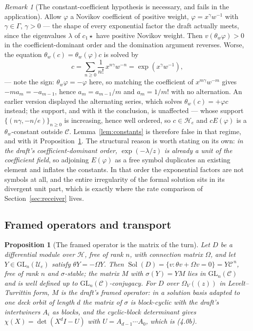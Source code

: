 \documentclass[11pt]{article}
\newtheorem{proposition}[theorem]{Proposition}
\theoremstyle{definition}
\theoremstyle{remark}
\newtheorem{remark}[theorem]{Remark}
\begin{document}
\begin{remark}[The constant-coefficient hypothesis is necessary, and fails in
the application]
\label{rem:constants-fails}
Allow $\varphi$ a Novikov coefficient of positive weight, $\varphi=x^\gamma
w^{-1}$ with $\gamma\in\Gamma$, $\gamma>0$ --- the shape of every exponential
factor the draft actually meets, since the eigenvalues $\lambda$ of $c_1\star$
have positive Novikov weight. Then $v(\theta_w\varphi)>0$ in the
coefficient-dominant order and the domination argument reverses. Worse, the
equation $\theta_w(c)=\theta_w(\varphi)c$ is solved by
\[
  c=\sum_{n\ge0}\frac{1}{n!}\,x^{n\gamma}w^{-n}=\exp(x^\gamma w^{-1}),
\]
--- note the sign: $\theta_w\varphi=-\varphi$ here, so matching the coefficient of
$x^{m\gamma}w^{-m}$ gives $-ma_m=-a_{m-1}$, hence $a_m=a_{m-1}/m$ and
$a_m=1/m!$ with no alternation. An earlier version displayed the alternating
series, which solves $\theta_w(c)=+\varphi c$ instead; the support, and with it
the conclusion, is unaffected ---
whose support $\{(n\gamma,-n/e)\}_{n\ge0}$ is increasing, hence well ordered, so
$c\in\mathcal H_e$ and $cE(\varphi)$ is a $\theta_w$-constant outside
$\mathcal C$. Lemma~\ref{lem:constants} is therefore false in that regime, and
with it Proposition~\ref{prop:framed-is-turn}. The structural reason is worth
stating on its own: \emph{in the draft's coefficient-dominant order,
$\exp(-\lambda/z)$ is already a unit of the coefficient field}, so adjoining
$E(\varphi)$ as a free symbol duplicates an existing element and inflates the
constants. In that order the exponential factors are not symbols at all, and the
entire irregularity of the formal solution sits in its divergent unit part,
which is exactly where the rate comparison of Section~\ref{sec:receiver} lives.
\end{remark}

\subsection*{Framed operators and transport}

\begin{proposition}[The framed operator is the matrix of the turn]
\label{prop:framed-is-turn}
Let $D$ be a differential module over $\mathcal H$, free of rank $n$, with
connection matrix $\Omega$, and let $Y\in\mathrm{GL}_n(\mathcal U_e)$ satisfy
$\theta Y=-\Omega Y$. Then
$\operatorname{Sol}(D)=\{v:\theta v+\Omega v=0\}=Y\mathcal C^{\,n}$, free of
rank $n$ and $\sigma$-stable; the matrix $M$ with $\sigma(Y)=YM$ lies in
$\mathrm{GL}_n(\mathcal C)$ and is well defined up to
$\mathrm{GL}_n(\mathcal C)$-conjugacy. For $D$ over $\Omega_V(\!(z)\!)$ in
Levelt--Turrittin form, $M$ is the draft's framed operator: in a solution basis
adapted to one deck orbit of length $d$ the matrix of $\sigma$ is block-cyclic
with the draft's intertwiners $A_i$ as blocks, and the cyclic-block determinant
gives $\chi(X)=\det(X^dI-U)$ with $U=A_{d-1}\cdots A_0$, which is (4.0b).
\end{proposition}
\end{document}
